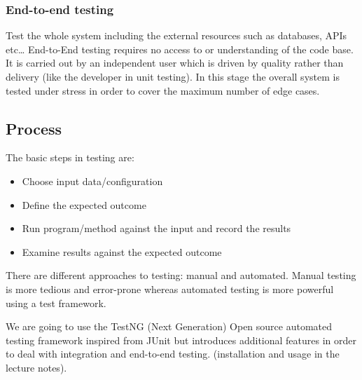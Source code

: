 \documentclass{article}
\begin{document}
	\subsubsection*{End-to-end testing}	
	Test the whole system including the external resources such as databases, APIs etc\ldots
	End-to-End testing requires no access to or understanding of the code base.
	It is carried out by an independent user which is driven by quality rather than delivery (like the
	developer in unit testing). In this stage the overall system is tested under stress in order to
	cover the maximum number of edge cases.
	
	\subsection*{Process}	
	The basic steps in testing are:
	\begin{itemize}
		\item Choose input data/configuration
		\item Define the expected outcome
		\item Run program/method against the input and record the results
		\item Examine results against the expected outcome
	\end{itemize}
	
	There are different approaches to testing: manual and automated. Manual testing is more tedious and
	error-prone whereas automated testing is more powerful using a test framework.
	
	We are going to use the TestNG (Next Generation) Open source automated testing framework inspired
	from JUnit but introduces additional features in order to deal with integration and end-to-end testing.
	(installation and usage in the lecture notes).
	
\end{document}
